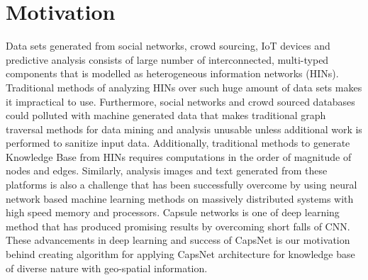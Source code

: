 \section{Motivation}
Data sets generated from social networks, crowd sourcing, IoT devices and predictive analysis consists of large number of interconnected, multi-typed components that is modelled as heterogeneous information networks (HINs). Traditional methods of analyzing HINs over such huge amount of data sets makes it impractical to use. Furthermore, social networks and crowd sourced databases could polluted with machine generated data that makes traditional graph traversal methods for data mining and analysis unusable unless additional work is performed to sanitize input data. Additionally, traditional methods to generate Knowledge Base from HINs requires computations in the order of magnitude of nodes and edges. Similarly, analysis images and text generated from these platforms is also a challenge that has been successfully overcome by using neural network based machine learning methods on massively distributed systems with high speed memory and processors. Capsule networks is one of deep learning method that has produced promising results by overcoming short falls of CNN. These advancements in deep learning and success of CapsNet is our motivation behind creating algorithm for applying CapsNet architecture for knowledge base of diverse nature with geo-spatial information.